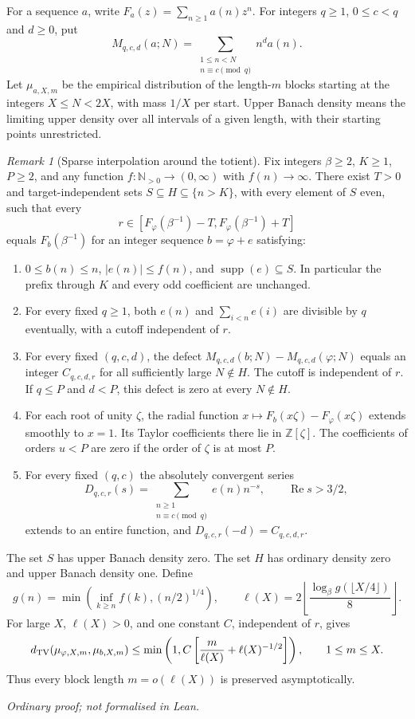 \documentclass[11pt]{article}
\theoremstyle{plain}
\theoremstyle{definition}
\theoremstyle{remark}
\newtheorem{rem}[thm]{Remark}
\newcommand{\N}{\mathbb{N}}
\newcommand{\Z}{\mathbb{Z}}
\begin{document}
For a sequence $a$, write $F_a(z)=\sum_{n\ge1}a(n)z^n$. For integers
$q\ge1$, $0\le c<q$ and $d\ge0$, put
\[
 M_{q,c,d}(a;N)=\sum_{\substack{1\le n<N\\ n\equiv c\pmod q}}n^d a(n).
\]
Let $\mu_{a,X,m}$ be the empirical distribution of the length-$m$ blocks
starting at the integers $X\le N<2X$, with mass $1/X$ per start. Upper
Banach density means the limiting upper density over all intervals of a
given length, with their starting points unrestricted.

\begin{rem}[Sparse interpolation around the totient]
\label{long249:thm:signed-interpolation}
Fix integers $\beta\ge2$, $K\ge1$, $P\ge2$, and any function
$f:\N_{>0}\to(0,\infty)$ with $f(n)\to\infty$. There exist $T>0$ and
target-independent sets $S\subseteq H\subseteq\{n>K\}$, with every
element of $S$ even, such that every
\[
 r\in[F_\varphi(\beta^{-1})-T,F_\varphi(\beta^{-1})+T]
\]
equals $F_b(\beta^{-1})$ for an integer sequence $b=\varphi+e$ satisfying:
\begin{enumerate}[label=(\roman*)]
\item $0\le b(n)\le n$, $|e(n)|\le f(n)$, and
$\operatorname{supp}(e)\subseteq S$. In particular the prefix through $K$
and every odd coefficient are unchanged.
\item For every fixed $q\ge1$, both $e(n)$ and $\sum_{i<n}e(i)$ are
divisible by $q$ eventually, with a cutoff independent of $r$.
\item For every fixed $(q,c,d)$, the defect
$M_{q,c,d}(b;N)-M_{q,c,d}(\varphi;N)$ equals an integer $C_{q,c,d,r}$
for all sufficiently large $N\notin H$. The cutoff is independent of $r$.
If $q\le P$ and $d<P$, this defect is zero at every $N\notin H$.
\item For each root of unity $\zeta$, the radial function
$x\mapsto F_b(x\zeta)-F_\varphi(x\zeta)$ extends smoothly to $x=1$.
Its Taylor coefficients there lie in $\Z[\zeta]$. The coefficients of
orders $u<P$ are zero if the order of $\zeta$ is at most $P$.
\item For every fixed $(q,c)$ the absolutely convergent series
\[
 D_{q,c,r}(s)=\sum_{\substack{n\ge1\\n\equiv c\pmod q}}e(n)n^{-s},
 \qquad \operatorname{Re}s>3/2,
\]
extends to an entire function, and $D_{q,c,r}(-d)=C_{q,c,d,r}$.
\end{enumerate}
The set $S$ has upper Banach density zero. The set $H$ has ordinary density
zero and upper Banach density one. Define
\[
 g(n)=\min\left(\inf_{k\ge n}f(k),(n/2)^{1/4}\right),\qquad
 \ell(X)=2\left\lfloor\frac{\log_\beta g(\lfloor X/4\rfloor)}8\right\rfloor.
\]
For large $X$, $\ell(X)>0$, and one constant $C$, independent of $r$, gives
\[
 d_{\rm TV}(\mu_{\varphi,X,m},\mu_{b,X,m})
 \le\min\left(1,C\left[\frac m{\ell(X)}+\ell(X)^{-1/2}\right]\right),
 \qquad 1\le m\le X.
\]
Thus every block length $m=o(\ell(X))$ is preserved asymptotically.
\end{rem}
\noindent\emph{Ordinary proof; not formalised in Lean.}
\end{document}
